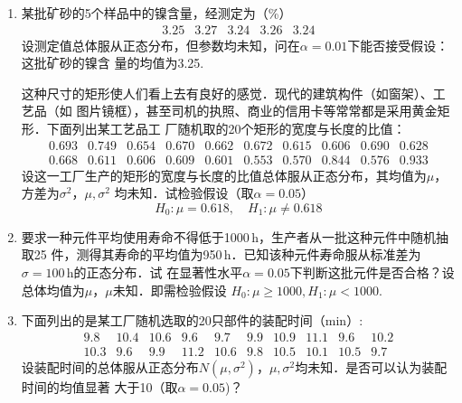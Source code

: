 \documentclass[10pt,a4paper]{article}
\begin{document}
\begin{enumerate}


    \item 某批矿砂的5个样品中的镍含量，经测定为（\%）
    $$\begin{array}{ccccc}
        3.25 & 3.27 &  3.24 & 3.26 & 3.24
    \end{array}$$
    设测定值总体服从正态分布，但参数均未知，问在$\alpha=0.01$下能否接受假设：这批矿砂的镍含
    量的均值为3.25.
    \clearpage


    这种尺寸的矩形使人们看上去有良好的感觉．现代的建筑构件（如窗架）、工艺品（如
    图片镜框），甚至司机的执照、商业的信用卡等常常都是采用黄金矩形．下面列出某工艺品工
    厂随机取的20个矩形的宽度与长度的比值：
    $$\begin{array}{cccccccccc}
        0.693 & 0.749 & 0.654 & 0.670 & 0.662  & 0.672 &  0.615 &  0.606 & 0.690 & 0.628\\
        0.668 & 0.611 & 0.606 & 0.609  & 0.601 & 0.553 & 0.570  & 0.844 &  0.576 &  0.933 
    \end{array}$$
    设这一工厂生产的矩形的宽度与长度的比值总体服从正态分布，其均值为$\mu$，方差为$\sigma^2$，$\mu,\sigma^2$
    均未知．试检验假设（取$\alpha=0.05$）
    $$H_0:\mu=0.618,\quad H_1:\mu\neq 0.618$$
    \clearpage





    \item 要求一种元件平均使用寿命不得低于1000$\, \mathrm{h}$，生产者从一批这种元件中随机抽取25
    件，测得其寿命的平均值为950$\, \mathrm{h}$．已知该种元件寿命服从标准差为$\sigma=100\, \mathrm{h}$的正态分布．试
    在显著性水平$\alpha=0.05$下判断这批元件是否合格？设总体均值为$\mu$，$\mu$未知．即需检验假设
    $H_0:\mu\geq 1000,H_1:\mu<1000$.
    \clearpage



    \item 下面列出的是某工厂随机选取的20只部件的装配时间（min）:
    $$\begin{array}{cccccccccc}
        9.8 &  10.4 &  10.6 &  9.6 &  9.7 &  9.9  & 10.9 &  11.1 &  9.6 &  10.2\\
        10.3 &  9.6 &  9.9 &  11.2 &  10.6 &  9.8  &  10.5 &  10.1 &  10.5 &  9.7
    \end{array}$$
    设装配时间的总体服从正态分布$N(\mu,\sigma^2)$，$\mu,\sigma^2$均未知．是否可以认为装配时间的均值显著
    大于10（取$\alpha=0.05$)？
    \clearpage




\end{enumerate}
\end{document}
